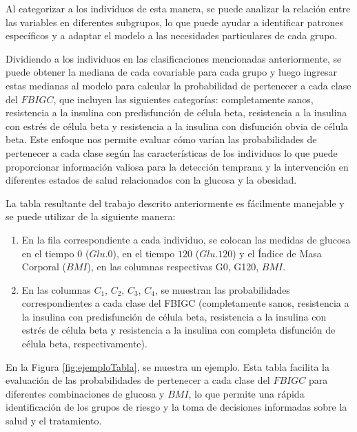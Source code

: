 Al categorizar a los individuos de esta manera, se puede analizar la relación entre las variables en diferentes subgrupos, lo que puede ayudar a identificar patrones específicos y a adaptar el modelo a las necesidades particulares de cada grupo.

Dividiendo a los individuos en las clasificaciones mencionadas anteriormente, se puede obtener la mediana de cada covariable para cada grupo y luego ingresar estas medianas al modelo para calcular la probabilidad de pertenecer a cada clase del $FBIGC$, que incluyen las siguientes categorías: completamente sanos, resistencia a la insulina con predisfunción de célula beta, resistencia a la insulina con estrés de célula beta y resistencia a la insulina con disfunción obvia de célula beta. Este enfoque nos permite evaluar cómo varían las probabilidades de pertenecer a cada clase según las características de los individuos lo que puede proporcionar información valiosa para la detección temprana y la intervención en diferentes estados de salud relacionados con la glucosa y la obesidad.

La tabla resultante del trabajo descrito anteriormente es fácilmente manejable y se puede utilizar de la siguiente manera:

\begin{enumerate}
    \item En la fila correspondiente a cada individuo, se colocan las medidas de glucosa en el tiempo $0$ ($Glu.0$), en el tiempo $120$ ($Glu.120$) y el Índice de Masa Corporal ($BMI$), en las columnas respectivas G0, G120, $BMI$.

    \item En las columnas $C_1$, $C_2$, $C_3$, $C_4$, se muestran las probabilidades correspondientes a cada clase del FBIGC (completamente sanos, resistencia a la insulina con predisfunción de célula beta, resistencia a la insulina con estrés de célula beta y resistencia a la insulina con completa disfunción de célula beta, respectivamente).
\end{enumerate}

En la Figura \ref{fig:ejemploTabla}, se muestra un ejemplo. Esta tabla facilita la evaluación de las probabilidades de pertenecer a cada clase del $FBIGC$ para diferentes combinaciones de glucosa y $BMI$, lo que permite una rápida identificación de los grupos de riesgo y la toma de decisiones informadas sobre la salud y el tratamiento.

